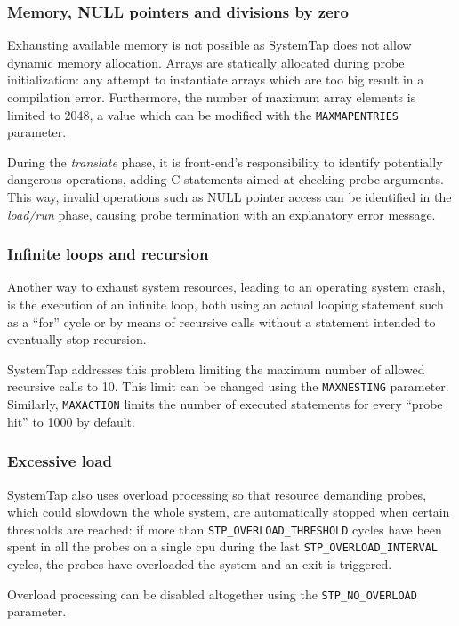 \documentclass[11pt]{article}
\begin{document}
\subsubsection{Memory, NULL pointers and divisions by zero}
Exhausting available memory is not possible as SystemTap does not allow dynamic
memory allocation. Arrays are statically allocated during probe initialization:
any attempt to instantiate arrays which are too big result in a compilation
error. Furthermore, the number of maximum array elements is limited to 2048, a
value which can be modified with the \verb|MAXMAPENTRIES| parameter.

During the \emph{translate} phase, it is front-end's responsibility to identify
potentially dangerous operations, adding C statements aimed at checking probe
arguments. This way, invalid operations such as NULL pointer access can be
identified in the \emph{load/run} phase, causing probe termination with an
explanatory error message.

\subsubsection{Infinite loops and recursion}
Another way to exhaust system resources, leading to an operating system crash,
is the execution of an infinite loop, both using an actual looping statement
such as a ``for'' cycle or by means of recursive calls without a statement
intended to eventually stop recursion.

SystemTap addresses this problem limiting the maximum number of allowed
recursive calls to 10. This limit can be changed using the \verb|MAXNESTING|
parameter. Similarly, \verb|MAXACTION| limits the number of executed statements
for every ``probe hit'' to 1000 by default. 

\subsubsection{Excessive load}
\label{systemtap:overload}
SystemTap also uses overload processing so that resource demanding probes, which
could slowdown the whole system, are automatically stopped when certain
thresholds are reached: if more than \verb|STP_OVERLOAD_THRESHOLD| cycles have
been spent in all the probes on a single cpu during the last
\verb|STP_OVERLOAD_INTERVAL| cycles, the probes have overloaded the system and
an exit is triggered\cite{manstap}.

Overload processing can be disabled altogether using the \verb|STP_NO_OVERLOAD|
parameter.
\end{document}
